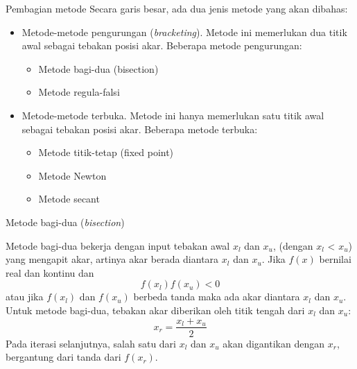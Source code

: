 \begin{frame}{Pembagian metode}
Secara garis besar, ada dua jenis metode yang akan dibahas:
\begin{itemize}\tightlist
\item Metode-metode pengurungan (\textit{bracketing}). Metode ini memerlukan
  dua titik awal sebagai tebakan posisi akar. Beberapa metode pengurungan:
  \begin{itemize}
  \item Metode bagi-dua (bisection)
  \item Metode regula-falsi
  \end{itemize}
\item Metode-metode terbuka. Metode ini hanya memerlukan satu titik awal sebagai
  tebakan posisi akar. Beberapa metode terbuka:
  \begin{itemize}
  \item Metode titik-tetap (fixed point)
  \item Metode Newton
  \item Metode secant
  \end{itemize}
\end{itemize}
\end{frame}


\begin{frame}{Metode bagi-dua (\textit{bisection})}

Metode bagi-dua bekerja dengan input tebakan awal $x_l$ dan $x_u$,
(dengan $x_l$ < $x_u$) yang
mengapit akar, artinya akar berada diantara $x_l$ dan $x_u$.
Jika $f(x)$ bernilai real dan kontinu dan
$$
f(x_l) f(x_u) < 0
$$
atau jika $f(x_l)$ dan $f(x_u)$ berbeda tanda maka ada
akar diantara $x_l$ dan $x_u$.
Untuk metode bagi-dua, tebakan akar diberikan oleh titik tengah
dari $x_l$ dan $x_u$:
$$
x_{r} = \frac{x_l + x_u}{2}
$$
Pada iterasi selanjutnya, salah satu dari $x_l$ dan $x_u$ akan
digantikan dengan $x_r$, bergantung dari tanda dari $f(x_r)$.

\end{frame}


